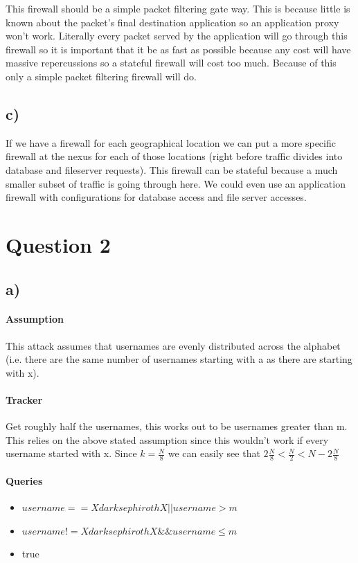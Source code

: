 \documentclass{article}
\begin{document}
This firewall should be a simple packet filtering gate way. This is because little is known about the packet's final destination application so an application proxy won't work. Literally every packet served by the application will go through this firewall so it is important that it be as fast as possible because any cost will have massive repercussions so a stateful firewall will cost too much. Because of this only a simple packet filtering firewall will do.

\subsection{c)} %
\label{sub:c_}
If we have a firewall for each geographical location we can put a more specific firewall at the nexus for each of those locations (right before traffic divides into database and fileserver requests). This firewall can be stateful because a much smaller subset of traffic is going through here. We could even use an application firewall with configurations for database access and file server accesses.

\section{Question 2} %
\label{sec:question_2}
\subsection{a)} %
\label{sub:a_}
\paragraph{Assumption} %
\label{par:assumption}
This attack assumes that usernames are evenly distributed across the alphabet (i.e. there are the same number of usernames starting with a as there are starting with x).
\paragraph{Tracker} %
\label{par:tracker}
Get roughly half the usernames, this works out to be usernames greater than m. This relies on the above stated assumption since this wouldn't work if every username started with x. Since $k = \frac{N}{8}$ we can easily see that $2 \frac{N}{8} < \frac{N}{2} < N - 2 \frac{N}{8}$
\paragraph{Queries} %
\label{par:queries}
\begin{itemize}
	\item $username == XdarksephirothX || username > m$
	\item $username != XdarksephirothX \&\& username \leq m$
	\item true
\end{itemize}
\end{document}
